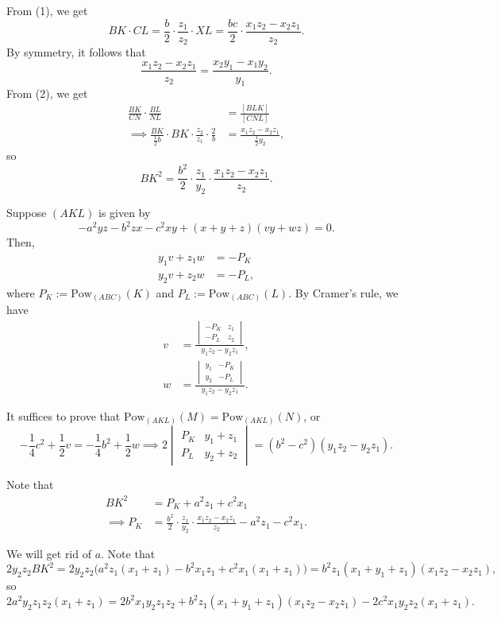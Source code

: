 \documentclass[11pt]{article}
\begin{document}
\noindent From (1), we get
\[
BK \cdot CL = \frac{b}{2} \cdot \frac{z_1}{z_2} \cdot XL = \frac{bc}{2} \cdot \frac{x_1z_2-x_2z_1}{z_2}.
\]
By symmetry, it follows that
\[
\boxed{\frac{x_1z_2-x_2z_1}{z_2} = \frac{x_2y_1-x_1y_2}{y_1}}.
\]
From (2), we get
\begin{align*}
\frac{BK}{CN} \cdot \frac{BL}{NL} &= \frac{[BLK]}{[CNL]} \\
\implies \frac{BK}{\frac{1}{2}b} \cdot BK \cdot \frac{z_2}{z_1} \cdot \frac{2}{b} &= \frac{x_1z_2-x_2z_1}{\frac{1}{2}y_2},
\end{align*}
so
\[
\boxed{BK^2 = \frac{b^2}{2} \cdot \frac{z_1}{y_2} \cdot \frac{x_1z_2-x_2z_1}{z_2}}.
\]

\noindent Suppose $(AKL)$ is given by
\[
-a^2yz - b^2zx - c^2xy + (x+y+z)(vy+wz) = 0.
\]
Then,
\begin{align*}
y_1v + z_1w &= -P_K \\
y_2v + z_2w &= -P_L,
\end{align*}
where $P_K := \mathrm{Pow}_{(ABC)}(K)$ and $P_L := \mathrm{Pow}_{(ABC)}(L)$. By Cramer's rule, we have
\begin{align*}
v &= \frac{
\begin{vmatrix}
-P_K & z_1 \\
-P_L & z_2
\end{vmatrix}
}{y_1z_2-y_2z_1}, \\
w &= \frac{
\begin{vmatrix}
y_1 & -P_K \\
y_2 & -P_L
\end{vmatrix}
}{y_1z_2-y_2z_1}.
\end{align*}

\noindent It suffices to prove that $\mathrm{Pow}_{(AKL)}(M) = \mathrm{Pow}_{(AKL)}(N)$, or
\[
-\frac{1}{4}c^2 + \frac{1}{2}v = -\frac{1}{4}b^2 + \frac{1}{2}w \implies 2
\begin{vmatrix}
P_K & y_1+z_1 \\
P_L & y_2+z_2
\end{vmatrix}
= (b^2-c^2)(y_1z_2-y_2z_1). \tag{3}
\]

\noindent Note that
\begin{align*}
BK^2 &= P_K + a^2z_1 + c^2x_1 \\
\implies P_K &= \frac{b^2}{2} \cdot \frac{z_1}{y_2} \cdot \frac{x_1z_2-x_2z_1}{z_2} - a^2z_1 - c^2x_1.
\end{align*}

\noindent We will get rid of $a$. Note that
\[
2y_2z_2BK^2 = 2y_2z_2 \Big(a^2z_1(x_1+z_1) - b^2x_1z_1 + c^2x_1(x_1+z_1)\Big) = b^2z_1(x_1+y_1+z_1)(x_1z_2-x_2z_1),
\]
so
\[
2a^2y_2z_1z_2(x_1+z_1) = 2b^2x_1y_2z_1z_2 + b^2z_1(x_1+y_1+z_1)(x_1z_2-x_2z_1) - 2c^2x_1y_2z_2(x_1+z_1).
\]
\end{document}
